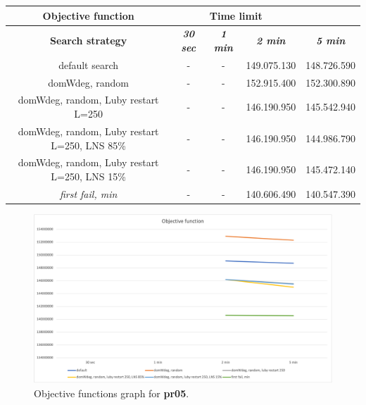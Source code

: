 {
\renewcommand{\arraystretch}{2}
\begin{longtable}[h]{| c | c | c | c | c |}
    \hline
    \textbf{Objective function} & \multicolumn{3}{c}{Time limit} & \\
    \hline
    \textbf{Search strategy} & \textbf{\textit{30 sec}} & \textbf{\textit{1 min}} & \textbf{\textit{2 min}} & \textbf{\textit{5 min}} \\
    \hline
    \endhead
    default search                                        & - & - & 149.075.130 & 148.726.590 \\
    \hline
    domWdeg, random                                       & - & - & 152.915.400 & 152.300.890 \\
    \hline
    domWdeg, random, Luby restart L=250                   & - & - & 146.190.950 & 145.542.940 \\
    \hline
    domWdeg, random, Luby restart L=250, LNS 85\%         & - & - & 146.190.950 & 144.986.790 \\
    \hline
    domWdeg, random, Luby restart L=250, LNS 15\%         & - & - & 146.190.950 & 145.472.140 \\
    \hline
    \textit{first fail, min}                              & - & - & 140.606.490 & 140.547.390 \\
    \hline
\end{longtable}
}
\begin{figure}[H]
    \centering
    \includegraphics[width=0.8\columnwidth]{../graphs/pr05-objf.png}
    \caption{Objective functions graph for \textbf{pr05}.}
\end{figure}


